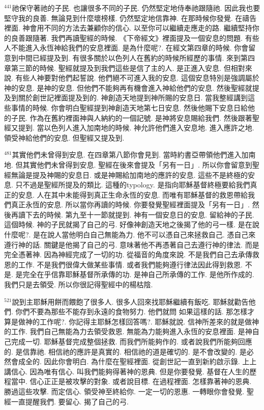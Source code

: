 \documentclass{book}
\begin{document}
$^{441}$祂保守著祂的子民.
也讓很多不同的子民.
仍然堅定地侍奉祂跟隨祂.
因此我也要堅守我的良善.
無論見到什麼壞榜樣.
仍然堅定地信靠神.
在那時候你發覺.
在禱告裡面.
神會用不同的方法去兼顧你的信心.
以至你可以繼續走應走的路.
繼續堅持你的良善跟隨著.
我們再讀聖經的時候.
《下帝經文》裡面提及一個安息的問題.
有些人不能進入永恆神給我們的安息裡面.
是為什麼呢?.
在經文第四章的時候.
你會留意到中間已經提及到.
有很多關於以色列人在舊約的時候所經歷的事情.
來到第四章第三節的時候.
聖經就提及到我們這些是信了主的人.
是正進入安息.
但相對來說.
有些人神要對他們起誓說.
他們絕不可進入我的安息.
這個安息特別是強調屬於神的安息.
是神的安息.
但他們不能夠再有機會進入神給他們的安息.
然後聖經就提及到關於創世記裡面提及到的.
神創造天地提到神所賜的安息日.
當我整經講到這些事情的時候.
你會明白聖經提到神創造天地第七日安息.
然後他賜下安息日給他的子民.
作為在舊約裡面神與人納約的一個記號.
是神將安息賜給我們.
然後跟著聖經又提到.
當以色列人進入加南地的時候.
神允許他們進入安息地.
進入應許之地.
領受神給他們的安息.
但聖經又提及到.

$^{481}$其實他們未曾得到安息.
在四章第八節你會見到.
當時約書亞帶領他們進入加南地.
但其實他們未曾得到安息.
聖經在後來會提及「另有一日」.
所以你會留意到聖經無論是提及神賜的安息日.
或是神賜給加南地的應許的安息.
這些不是終極的安息.
只不過是聖經所提及的類比.
這種的typology.
是指向耶穌基督終極要給我們真正的安息.
人在其中未能得到真正生命永恆的安息.
而唯有耶穌基督的救恩帶給我們真正永恆的安息.
所以當你再讀的時候.
你要發覺聖經裡面提及「另有一日」.
然後再讀下去的時候.
第九至十一節就提到.
神有一個安息日的安息.
留給神的子民.
這個時候.
神的子民就揭了自己的弓.
好像神創造天地之後揭了他的弓一樣.
是在說什麼呢?.
是在說人當他明白自己無能為力.
他不可以憑自己來拯救自己.
憑自己來遵行神的話.
關鍵是他揭了自己的弓.
意味著他不再憑著自己去遵行神的律法.
而是完全憑著神.
因為神經完成了一切的功.
從福音的角度來說.
不是我們自己去承傳救恩的工作.
不是我們很偉大做某些事情.
或者我們能夠遵行律法因此得到救恩.
不是.
是完全在乎信靠耶穌基督所承傳的功.
是神自己所承傳的工作.
是他所作成的.
我們只是去領受.
所以你很記得聖經中的楊枯陰.

$^{521}$說到主耶穌用餅而餵飽了很多人.
很多人回來找耶穌繼續有飯吃.
耶穌就勸告他們.
你們不要為那些不能存到永遠的食物努力.
他們就問 如果這樣的話.
那怎樣才算是做神的工作呢?.
你記得主耶穌怎樣回答嗎?.
耶穌就說.
信神所差來的就是做神的工作.
我們自己無能為力去領受救恩.
無能為力能夠進入永恆的安息裡面.
是神自己完成一切.
耶穌基督完成整個拯救.
而我們所能夠作的.
或者說我們所能夠回應的.
是信靠祂.
相信祂的應許是真實的.
相信祂的道是確切的.
是不會改變的.
是必然會成全的.
因此你會明白.
為什麼在聖經裡面.
從創世記一直到新約啟示錄.
上上講信心.
因為唯有信心.
叫我們能夠得著神的恩典.
但是你要發覺.
基督在人生的歷程當中.
信心正正是被攻擊的對象.
或者說目標.
在過程裡面.
怎樣靠著神的恩典.
勝過這些攻擊.
而定信心.
領受神至終給你.
一定一切的恩惠.
一轉眼你會發覺.
聖經一直提醒我們.
要留心.
揭了自己的弓.
\end{document}
